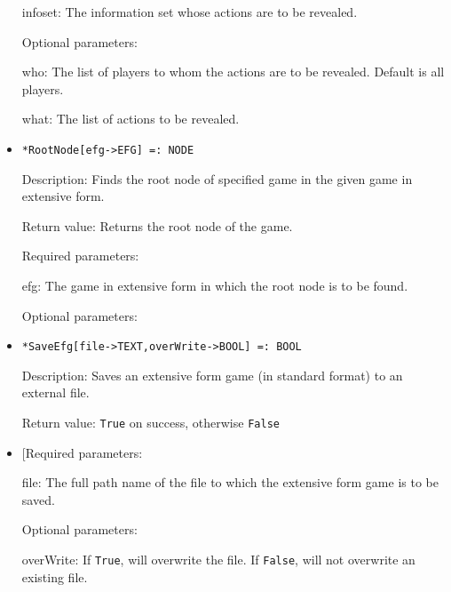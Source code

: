 \begin{itemize}
\bd
\item
[infoset:] The information set whose actions are to be revealed.  
\ed

\item
[Optional parameters:]\hfil\null
\bd
\item
[who:] The list of players to whom the actions are to be revealed.
Default is all players. 
\item
[what:] The list of actions to be revealed.  
\ed

\ed


\item
\protect \large \begin{verbatim}
*RootNode[efg->EFG] =: NODE
\end{verbatim}\normalsize

\bd
\item
[Description:] Finds the root node of specified game in the given
game in extensive form.  
\item
[Return value:] Returns the root node of the game.
\item
[Required parameters:]\hfil\null
	
\bd
\item
[efg:] The game in extensive form in which the root node is to be
found.
\ed

\item
[Optional parameters:]\hfil\null

\ed


\item
\protect \large \begin{verbatim}
*SaveEfg[file->TEXT,overWrite->BOOL] =: BOOL
\end{verbatim}\normalsize

\bd
\item
[Description:] Saves an extensive form game (in standard format) to an
external file.  
\item
[Return value:] \verb+True+ on success, otherwise \verb+False+
\item

[Required parameters:

\bd
\item
[file:] The full path name of the file to which the extensive form game
is to be saved. \ed

\item
[Optional parameters:]\hfil\null
\bd
\item
[overWrite:] If \verb+True+, will overwrite the file.  If \verb+False+, will
not overwrite an existing file.  
\ed
\ed


\end{itemize}
